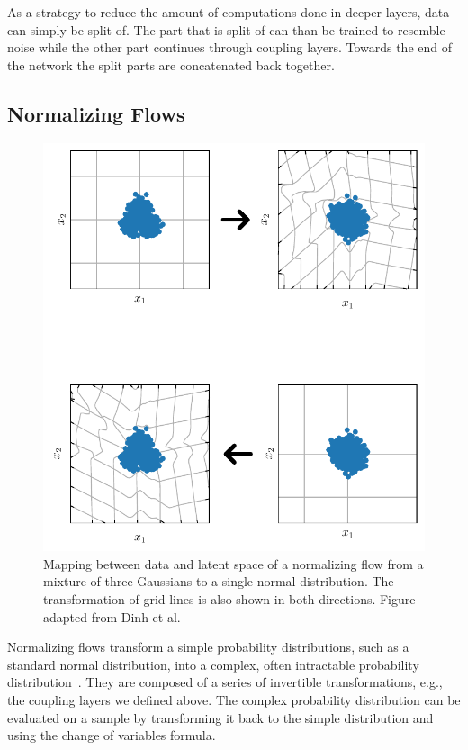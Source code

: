 As a strategy to reduce the amount of computations done in deeper layers, data can
simply be split of. The part that is split of can than be trained to resemble
noise while the other part continues through coupling layers. Towards the end
of the network the split parts are concatenated back together.


\subsection{Normalizing Flows}%
\label{sub:normalizing_flows}

\begin{figure}[htpb]
    \centering
    \includegraphics{figures/toy_example/gaussian_mixture/grid_transformed.pdf}
    \caption{Mapping between data and latent space of a normalizing flow from a
    mixture of three Gaussians to a single normal distribution. The
transformation of grid lines is also shown in both directions. Figure adapted
from Dinh et al.~\citep{dinhDensityEstimationUsing2017}}%
    \label{fig:normalizing_flow_mapping}
\end{figure}

Normalizing flows transform a simple probability distributions, such as a
standard normal distribution, into a complex, often intractable probability
distribution~\citep{kobyzevNormalizingFlowsIntroduction2020}. They are composed
of a series of invertible transformations, e.g., the coupling layers we defined
above. The complex probability distribution can be evaluated on a sample by
transforming it back to the simple distribution and using the change of
variables formula.

